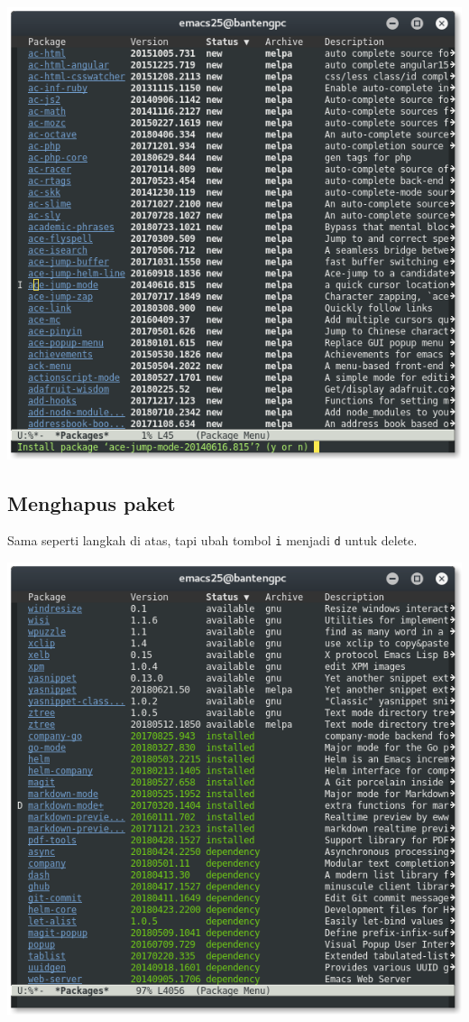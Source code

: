 \documentclass{article}
\begin{document}
\includegraphics[scale=.5]{images/emacs_repo_install_2.png} 


\subsection{Menghapus paket}
Sama seperti langkah di atas, tapi ubah tombol \verb=i= menjadi \verb=d= untuk delete.

\includegraphics[scale=.5]{images/emacs_delete_package.png} 
\end{document}
